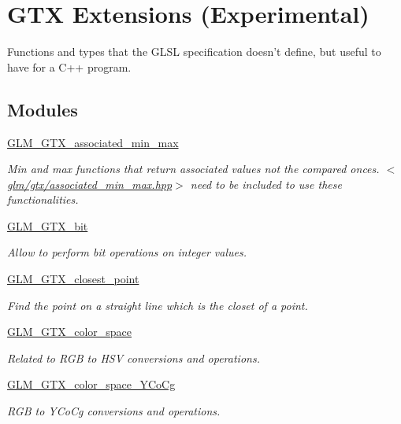 \hypertarget{group__gtx}{\section{G\-T\-X Extensions (Experimental)}
\label{group__gtx}
}


Functions and types that the G\-L\-S\-L specification doesn't define, but useful to have for a C++ program.  


\subsection*{Modules}
\begin{DoxyCompactItemize}
\item 
\hyperlink{group__gtx__associated__min__max}{G\-L\-M\-\_\-\-G\-T\-X\-\_\-associated\-\_\-min\-\_\-max}
\begin{DoxyCompactList}\small\item\em Min and max functions that return associated values not the compared onces. $<$\hyperlink{associated__min__max_8hpp}{glm/gtx/associated\-\_\-min\-\_\-max.\-hpp}$>$ need to be included to use these functionalities. \end{DoxyCompactList}\item 
\hyperlink{group__gtx__bit}{G\-L\-M\-\_\-\-G\-T\-X\-\_\-bit}
\begin{DoxyCompactList}\small\item\em Allow to perform bit operations on integer values. \end{DoxyCompactList}\item 
\hyperlink{group__gtx__closest__point}{G\-L\-M\-\_\-\-G\-T\-X\-\_\-closest\-\_\-point}
\begin{DoxyCompactList}\small\item\em Find the point on a straight line which is the closet of a point. \end{DoxyCompactList}\item 
\hyperlink{group__gtx__color__space}{G\-L\-M\-\_\-\-G\-T\-X\-\_\-color\-\_\-space}
\begin{DoxyCompactList}\small\item\em Related to R\-G\-B to H\-S\-V conversions and operations. \end{DoxyCompactList}\item 
\hyperlink{group__gtx__color__space___y_co_cg}{G\-L\-M\-\_\-\-G\-T\-X\-\_\-color\-\_\-space\-\_\-\-Y\-Co\-Cg}
\begin{DoxyCompactList}\small\item\em R\-G\-B to Y\-Co\-Cg conversions and operations. \end{DoxyCompactList}\item 

\end{DoxyCompactItemize}
